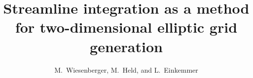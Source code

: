 



\title{Streamline integration as a method for two-dimensional elliptic grid generation}
\author{M.~Wiesenberger, M.~Held, and L.~Einkemmer}
 
